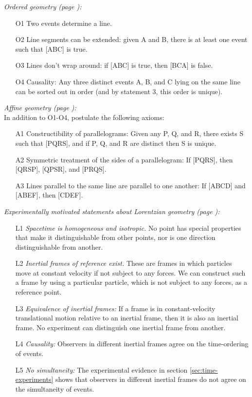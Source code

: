 \documentclass{genrel}
\begin{document}
\emph{Ordered geometry (page \pageref{ordered-geometry-axioms}):}\\\label{ordered-summary}
\begin{itemize}
\item[O1] Two events determine a line.
\item[O2] Line segments can be extended: given A and B, there is at least one event such that [ABC] is true.
\item[O3] Lines don't wrap around: if [ABC] is true, then [BCA] is false.
\item[O4] Causality: Any three distinct events A, B, and C lying on the same line can be sorted out in order (and by statement 3, this order is unique).
\end{itemize}

\emph{Affine geometry (page \pageref{affine-axioms}):}\\\label{affine-summary}
In addition to O1-O4, postulate the following axioms:
\begin{itemize}
\item[A1] Constructibility of parallelograms: Given any P, Q, and R, there exists S such that [PQRS], and if P, Q, and R are distinct then S is unique.
\item[A2] Symmetric treatment of the sides of a parallelogram: If [PQRS], then [QRSP], [QPSR], and [PRQS].
\item[A3] Lines parallel to the same line are parallel to one another: If [ABCD] and [ABEF], then [CDEF].
\end{itemize}

\emph{Experimentally motivated statements about Lorentzian geometry (page \pageref{lorentz-geometry-postulates}):}\\\label{lorentz-summary}
\begin{itemize}\label{lorentz-geometry-postulates}
\item[L1] \emph{Spacetime is homogeneous and isotropic.} No point has special properties that make it distinguishable from other points, nor is one
                  direction distinguishable from another.
\item[L2] \emph{Inertial frames of reference exist.} These are frames in which particles move at constant velocity if not subject to any forces.
                  We can construct such a frame by using a particular particle, which is not subject to any forces, as a reference point.
\item[L3] \emph{Equivalence of inertial frames:} If a frame is in constant-velocity translational motion relative to an inertial frame, then it is also an inertial frame.
              No experiment can distinguish one inertial frame from another.
\item[L4] \emph{Causality:} Observers in different inertial frames agree on the time-ordering of events.
\item[L5] \emph{No simultaneity:} The experimental evidence in section \ref{sec:time-experiments} shows that
           observers in different inertial frames do not agree on the simultaneity of events.
\end{itemize}
\end{document}
